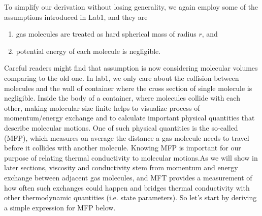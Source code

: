 To simplify our derivation without losing generality, we again employ some of the assumptions introduced in Lab1, and they are
\renewcommand{\labelenumi}{\Roman{enumi}.}
\begin{enumerate}
	\item gas molecules are treated as hard spherical mass of radius $ r $, and
	\item potential energy of each molecule is negligible.
\end{enumerate}
Careful readers might find that assumption  is now considering molecular volumes comparing to the old one.  In lab1, we only care about the collision between molecules and the wall of container where the cross section of single molecule is negligible. Inside the body of a container, where molecules collide with each other, making molecular size finite helps to visualize process of momentum/energy exchange and to calculate important physical quantities that describe molecular motions. One of such physical quantities is the so-called (MFP), which measures on average the distance a gas molecule needs to travel before it collides with another molecule. Knowing MFP is important for our purpose of relating thermal conductivity to molecular motions.As we will show in later sections, viscosity and conductivity stem from momentum and energy exchange between adjacent gas molecules, and MFT provides a measurement of how often such exchanges could happen and bridges thermal conductivity with other thermodynamic quantities (i.e. state parameters).  So let's start by deriving a simple expression for MFP below.

